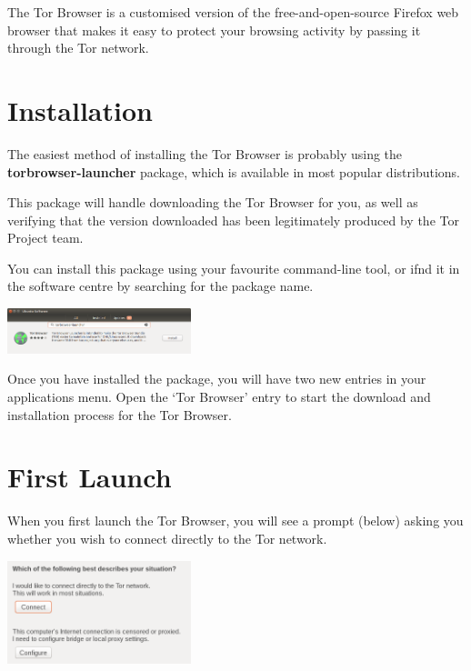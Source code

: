 \documentclass[10.5pt,a4paper]{article} %
\begin{document}
\begin{multicols*}{2} %

The Tor Browser is a customised version of the free-and-open-source Firefox web browser that makes it easy to protect your browsing activity by passing it through the Tor network.


\section*{Installation}
The easiest method of installing the Tor Browser is probably using the \textbf{torbrowser-launcher} package, which is available in most popular distributions.

This package will handle downloading the Tor Browser for you, as well as verifying that the version downloaded has been legitimately produced by the Tor Project team.

You can install this package using your favourite command-line tool, or ifnd it in the software centre by searching for the package name.

\begin{center}
	\includegraphics[width=0.40\textwidth]{tbb-store.png} %
\end{center}

Once you have installed the package, you will have two new entries in your applications menu. Open the `Tor Browser' entry to start the download and installation process for the Tor Browser.


\section*{First Launch}
When you first launch the Tor Browser, you will see a prompt (below) asking you whether you wish to connect directly to the Tor network.

\begin{center}
	\includegraphics[width=0.40\textwidth]{first-run.png}
\end{center}


\end{multicols*}
\end{document}
